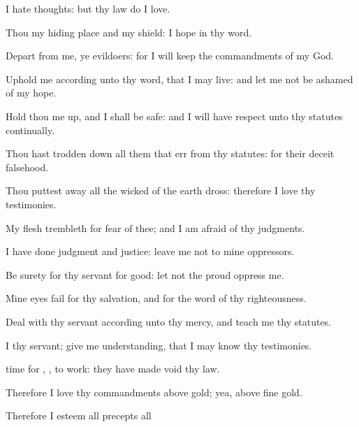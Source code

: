 {\par }{
\par }{\Q {}I
hate
{}
thoughts: but thy
law do I
love.
\par }{\Q {}Thou
{} my hiding
place and my
shield: I
hope in thy
word.
\par }{\Q {}Depart from me, ye
evildoers: for I will
keep the
commandments of my
God.
\par }{\BB \par }{\Q {}Uphold me according unto thy
word, that I may
live: and let me not be
ashamed of my
hope.
\par }{\Q {}Hold thou me
up, and I shall be
safe: and I will have
respect unto thy
statutes
continually.
\par }{\BB \par }{\Q {}Thou hast trodden
down all them that
err from thy
statutes: for their
deceit
{}
falsehood.
\par }{\Q {}Thou puttest
away all the
wicked of the
earth
{}
dross: therefore I
love thy
testimonies.
\par }{\Q {}My
flesh
trembleth for
fear of thee; and I am
afraid of thy
judgments.
\par }{\BB \par }{
\par }{\Q {}I have
done
judgment and
justice:
leave me not to mine
oppressors.
\par }{\Q {}Be
surety for thy
servant for
good: let not the
proud
oppress me.
\par }{\Q {}Mine
eyes
fail for thy
salvation, and for the
word of thy
righteousness.
\par }{\BB \par }{\Q {}Deal with thy
servant according unto thy
mercy, and
teach me thy
statutes.
\par }{\Q {}I
{} thy
servant; give me
understanding, that I may
know thy
testimonies.
\par }{\Q {}
time for
{},
{}, to
work:
{} they have made
void thy
law.
\par }{\BB \par }{\Q {}Therefore I
love thy
commandments above
gold; yea, above fine
gold.
\par }{\Q {}Therefore I esteem all
{}
precepts
{} all
}
